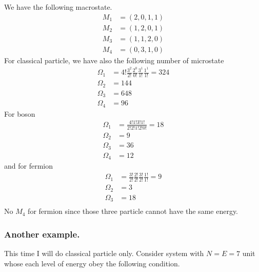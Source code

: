 \documentclass[../../../Main.tex]{subfiles}
\begin{document}
We have the following macrostate.
\begin{align*}
    M_1&=(2,0,1,1)\\
    M_2&=(1,2,0,1)\\
    M_3&=(1,1,2,0)\\
    M_4&=(0,3,1,0)
\end{align*}
For classical particle, we have also the following number of microstate
\begin{align*}
    \Omega_1&=4!\frac{3^2}{2!}\frac{2^0}{0!}\frac{3^1}{1!}\frac{1^1}{1!}=324\\
    \Omega_2&=144\\
    \Omega_3&=648\\
    \Omega_4&=96
\end{align*}
For boson 
\begin{align*}
    \Omega_1&=\frac{4!1!3!1!}{2!2!1!2!0!}=18\\
    \Omega_2&=9\\
    \Omega_3&=36\\
    \Omega_4&=12
\end{align*}
and for fermion
\begin{align*}
    \Omega_1&=\frac{3!}{2!}\frac{2!}{2!}\frac{3!}{2!}\frac{1!}{1!}=9\\
    \Omega_2&=3\\
    \Omega_3&=18\\
\end{align*}
No $M_4$ for fermion since those three particle cannot have the same energy. 

\subsubsection{Another example.} This time I will do classical particle only. Consider system with $N=E=7$ unit whose each level of energy obey the following condition.
\end{document}
